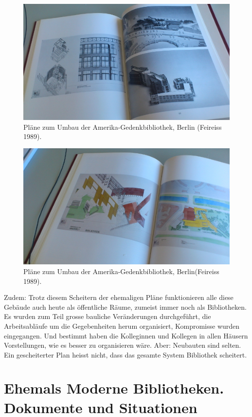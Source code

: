\documentclass[a4paper,
fontsize=11pt,
oneside,
numbers=noperiodatend,
parskip=half-,
bibliography=totoc,
final
]{scrartcl}
\begin{document}
\begin{figure}[htbp]
\centering
\includegraphics{./img/002.jpg}
\caption{Pläne zum Umbau der Amerika-Gedenkbibliothek, Berlin (Feireiss
1989).}
\end{figure}

\begin{figure}[H]
\centering
\includegraphics{./img/003.jpg}
\caption{Pläne zum Umbau der Amerika-Gedenkbibliothek, Berlin(Feireiss
1989).}
\end{figure}

Zudem: Trotz diesem Scheitern der ehemaligen Pläne funktionieren alle
diese Gebäude auch heute als öffentliche Räume, zumeist immer noch als
Bibliotheken. Es wurden zum Teil grosse bauliche Veränderungen
durchgeführt, die Arbeitsabläufe um die Gegebenheiten herum organisiert,
Kompromisse wurden eingegangen. Und bestimmt haben die Kolleginnen und
Kollegen in allen Häusern Vorstellungen, wie es besser zu organisieren
wäre. Aber: Neubauten sind selten. Ein gescheiterter Plan heisst nicht,
dass das gesamte System Bibliothek scheitert.

\section*{Ehemals Moderne Bibliotheken. Dokumente und
Situationen}\label{ehemals-moderne-bibliotheken.-dokumente-und-situationen}
\end{document}
